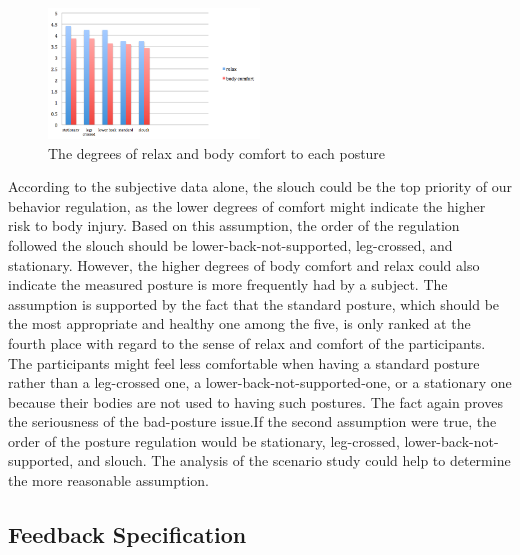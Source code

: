 \begin{figure}[h]
\centering
  \includegraphics[width=0.5\textwidth]{figs/subjective}
\caption{The degrees of relax and body comfort to each posture}
\end{figure}

According to the subjective data alone, the slouch could be the top priority of our behavior regulation, as the lower degrees of comfort might indicate the higher risk to body injury. Based on this assumption, the order of the regulation followed the slouch should be lower-back-not-supported, leg-crossed, and stationary. However, the higher degrees of body comfort and relax could also indicate the measured posture is more frequently had by a subject. The assumption is supported by the fact that the standard posture, which should be the most appropriate and healthy one among the five, is only ranked at the fourth place with regard to the sense of relax and comfort of the participants. The participants might feel less comfortable when having a standard posture rather than a leg-crossed one, a lower-back-not-supported-one, or a stationary one because their bodies are not used to having such postures. The fact again proves the seriousness of the bad-posture issue.If the second assumption were true, the order of the posture regulation would be stationary, leg-crossed, lower-back-not-supported, and slouch. The analysis of the scenario study could help to determine the more reasonable assumption.

\subsection{Feedback Specification}


